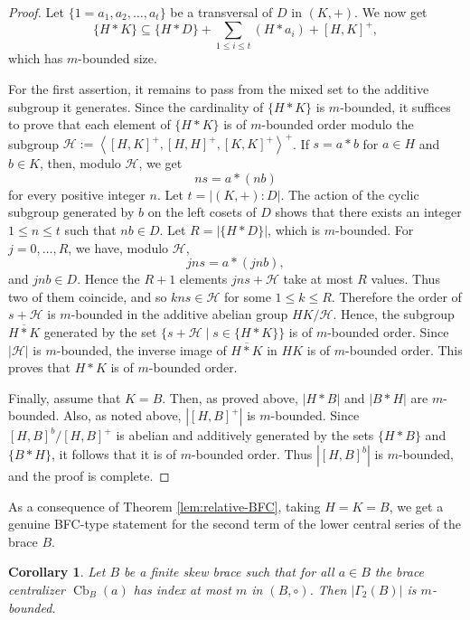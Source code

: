 \documentclass[11pt, oneside]{amsart}
\numberwithin{equation}{section}
\theoremstyle{plain}
\newtheorem{cor}[equation]{Corollary}
\theoremstyle{definition}
\newcommand{\Cb}{\operatorname{Cb} }
\newcommand{\gen}[1]{\left < #1 \right >}
\begin{document}
\begin{proof}
Let $\{1=a_1,a_2,\dots,a_t\}$ be a transversal of $D$ in $(K,+)$. We now get 
$$\{H*K\} \subseteq \{H*D\}+ \sum_{1\leqslant i\leqslant t}(H*a_i) + [H, K]^+,$$ 
which has $m$-bounded size. 


For the first assertion, it remains to pass from the mixed set to the additive subgroup it generates.
Since the cardinality of $\{H * K\}$ is $m$-bounded, it suffices to prove that each element of $\{H * K\}$ is of $m$-bounded order modulo the subgroup $\mathcal{H}:=\gen{[H,K]^+, [H, H]^+, [K, K]^+}^+$. If $s =a * b$ for $a \in H$ and $b \in K$, then, modulo  $\mathcal{H}$, we get
\[
 n  s = a*(n  b)
\]
for every positive integer $n$. Let $t=|(K,+):D|$. The action of the cyclic subgroup generated by $b$ on the left cosets of $D$ shows that there exists an integer $1\leqslant n\leqslant t$ such that $nb\in D$. Let $R=|\{H*D\}|$, which is $m$-bounded. For $j=0,\ldots,R$, we have, modulo $\mathcal H$,
$$
jns=a*(jnb),
$$
and $jnb\in D$. Hence the $R+1$ elements $jns+\mathcal H$ take at most $R$ values. Thus two of them coincide, and so $kns\in\mathcal H$ for some $1\leqslant k\leqslant R$. Therefore the order of $s+\mathcal H$ is $m$-bounded in the additive abelian group $HK/\mathcal H$. Hence, the subgroup $\overline{H * K}$ generated by the set $\{s + \mathcal{H} \mid s \in \{H * K\}\}$ is of $m$-bounded order. Since $|\mathcal{H}|$ is $m$-bounded, the inverse image of $\overline{H * K}$ in $HK$ is of $m$-bounded order. This proves that $H*K$ is of $m$-bounded order. 

Finally, assume that $K=B$. Then, as proved above, $|H*B|$ and $|B*H|$ are $m$-bounded. Also, as noted above,  $|[H, B]^+|$ is $m$-bounded.  Since $[H,B]^b/[H,B]^+$ is abelian and additively generated by  the sets $\{H * B\}$ and $\{B*H\}$, it follows that it is of $m$-bounded order. Thus  $|[H,B]^b|$ is  $m$-bounded, and the proof is complete.
\end{proof}

As a consequence of Theorem \ref{lem:relative-BFC}, taking $H = K = B$, we get a genuine BFC-type statement for the second term of the lower central series of the brace $B$.

\begin{cor}\label{cor:bfc-gamma}
Let $B$ be a finite skew brace such that  for all $a \in B$ the brace centralizer $\Cb_B(a)$ has index at most $m$ in $(B,\circ)$. Then $|\Gamma_2(B)|$ is $m$-bounded.
\end{cor}
\end{document}
